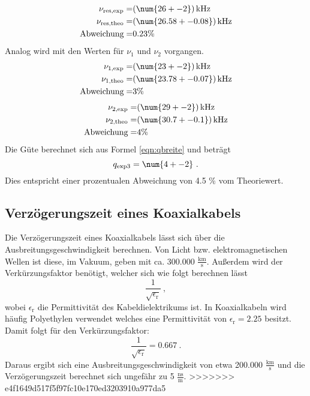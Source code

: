 \begin{eqnarray}
  \nu_\text{res,exp} =&  (\num{26 +- 2}) \, \text{kHz}			\\
  \nu_\text{res,theo} =& (\num{26.58 +- 0.08}) \, \text{kHz} \\
  \text{Abweichung} =& 0.23 \%
  \label{eqn:res}
\end{eqnarray}
Analog wird mit den Werten für $\nu_1$ und $\nu_2$ vorgangen.
\begin{eqnarray}
  \nu_\text{1,exp} =&  (\num{23 +- 2}) \, \text{kHz}                 \\
  \nu_\text{1,theo} =& (\num{23.78 +- 0.07}) \, \text{kHz} \\
  \text{Abweichung} =& 3 \%
\end{eqnarray}
\begin{eqnarray}
  \nu_\text{2,exp} =&  (\num{29 +- 2}) \, \text{kHz}                 \\
  \nu_\text{2,theo} =& (\num{30.7 +- 0.1}) \, \text{kHz} \\
  \text{Abweichung} =& 4 \%
\end{eqnarray}
Die Güte berechnet sich aus Formel \ref{eqn:qbreite} und beträgt
\begin{equation}
  q_\text{exp3} = \num{4 +- 2}  \ .
  \label{eqn:q3}
\end{equation}
Dies entspricht einer prozentualen Abweichung von 4.5 \% vom Theoriewert.

\subsection{Verzögerungszeit eines Koaxialkabels}
Die Verzögerungszeit eines Koaxialkabels lässt sich über die Ausbreitungsgeschwindigkeit berechnen. Von Licht bzw. elektromagnetischen Wellen ist diese, im Vakuum, geben mit ca. 300.000 $\frac{\text{km}}{\text{s}}$. Außerdem wird der Verkürzungsfaktor benötigt, welcher sich wie folgt berechnen lässt
\begin{equation*}
  \frac{1}{\sqrt{\epsilon_\text{r}}} \ ,
\end{equation*}
wobei $\epsilon_\text{r}$ die Permittivität des Kabeldielektrikums ist.
In Koaxialkabeln wird häufig Polyethylen verwendet welches eine Permittivität von $\epsilon_\text{r} = 2.25$ besitzt. Damit folgt für den Verkürzungsfaktor:
\begin{equation*}
  \frac{1}{\sqrt{\epsilon_\text{r}}} = 0.667 \ .
\end{equation*}
Daraus ergibt sich eine Ausbreitungsgeschwindigkeit von etwa 200.000 $\frac{\text{km}}{\text{s}}$ und die Verzögerungszeit berechnet sich ungefähr zu 5 $\frac{\text{ns}}{\text{m}}$.
>>>>>>> e4f1649d517f5f97fc10e170ed3203910a977da5
